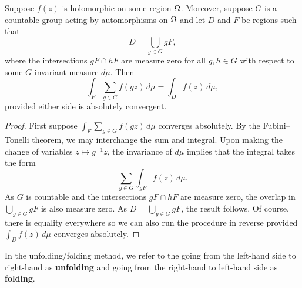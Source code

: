       \begin{theorem*}
        Suppose $f(z)$ is holomorphic on some region $\Omega$. Moreover, suppose $G$ is a countable group acting by automorphisms on $\Omega$ and let $D$ and $F$ be regions such that
        \[
          D = \bigcup_{g \in G}gF,
        \]
        where the intersections $gF \cap hF$ are measure zero for all $g,h \in G$ with respect to some $G$-invariant measure $d\mu$. Then 
        \[
          \int_{F}\sum_{g \in G}f(g z)\,d\mu = \int_{D}f(z)\,d\mu,
        \]
        provided either side is absolutely convergent.
      \end{theorem*}
      \begin{proof}
        First suppose $\int_{F}\sum_{g \in G}f(g z)\,d\mu$ converges absolutely. By the Fubini–Tonelli theorem, we may interchange the sum and integral. Upon making the change of variables $z \mapsto g^{-1}z$, the invariance of $d\mu$ implies that the integral takes the form
        \[
          \sum_{g \in G}\int_{gF}f(z)\,d\mu.
        \]
        As $G$ is countable and the intersections $gF \cap hF$ are measure zero, the overlap in $\bigcup_{g \in G}gF$ is also measure zero. As $D = \bigcup_{g \in G}gF$, the result follows. Of course, there is equality everywhere so we can also run the procedure in reverse provided $\int_{D}f(z)\,d\mu$ converges absolutely.
      \end{proof}

      In the unfolding/folding method, we refer to the going from the left-hand side to right-hand as \textbf{unfolding} and going from the right-hand to left-hand side as \textbf{folding}.

